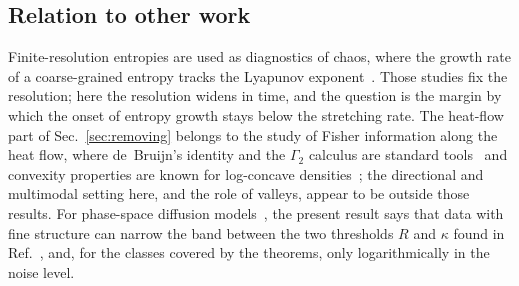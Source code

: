 \subsection{Relation to other work}

Finite-resolution entropies are used as diagnostics of chaos, where the growth rate of a coarse-grained entropy tracks the Lyapunov exponent~\cite{kannan2026}. Those studies fix the resolution; here the resolution widens in time, and the question is the margin by which the onset of entropy growth stays below the stretching rate. The heat-flow part of Sec.~\ref{sec:removing} belongs to the study of Fisher information along the heat flow, where de~Bruijn's identity and the $\Gamma_2$ calculus are standard tools~\cite{cover2006,bakry2014} and convexity properties are known for log-concave densities~\cite{toscani2015}; the directional and multimodal setting here, and the role of valleys, appear to be outside those results. For phase-space diffusion models~\cite{dockhorn2022,namba2026threshold,namba2026learned}, the present result says that data with fine structure can narrow the band between the two thresholds $R$ and $\kappa$ found in Ref.~\cite{namba2026learned}, and, for the classes covered by the theorems, only logarithmically in the noise level.
